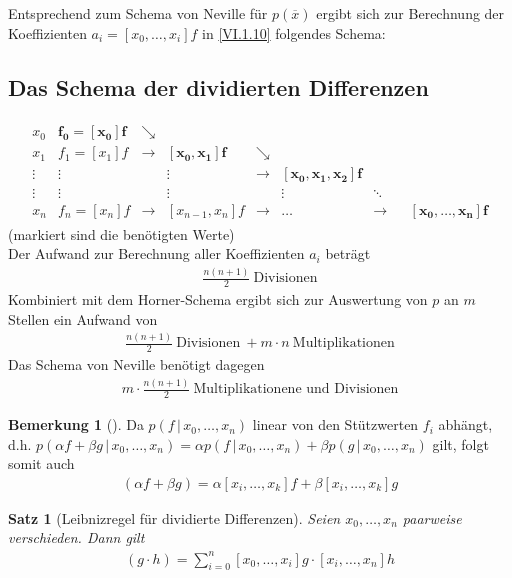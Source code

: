 \documentclass[ngerman,fontsize=11pt, paper=a4, parskip=half, titlepage=true, toc=bib]{scrbook}
\theoremstyle{definition}
\newtheorem{Bem}[Def]{Bemerkung}	%
\theoremstyle{plain}
\newtheorem{Satz}[Def]{Satz}		%
\newcommand{\subsectione}[1]{\addtocounter{Def}{1}\subsection{#1}}
\newenvironment{Satze}[1][]{ %
  \begin{Satz}[#1]  }
  { \end{Satz}
  	\addtocounter{subsection}{1}}
\newenvironment{Beme}[1][]{ %
  \begin{Bem}[#1]}
  {\end{Bem}
  	\addtocounter{subsection}{1}}
\begin{document}
Entsprechend zum Schema von Neville für $p(\overline{x})$
ergibt sich zur Berechnung der Koeffizienten $a_i=[x_0,\dots,x_i]f$
in \eqref{VI.1.10} folgendes Schema:

\subsectione{Das Schema der dividierten Differenzen}
 \begin{gather*}
   \begin{array}{ccccccccc}
          x_0 & \boldsymbol{f_0=[x_0]f} & \searrow\\
          x_1 & f_1=[x_1]f& \rightarrow &\boldsymbol{ [x_0,x_1]f}&\searrow \\
          \vdots&\vdots &&\vdots &\rightarrow & \boldsymbol{[x_0,x_1,x_2]f}\\
          \vdots&\vdots &&\vdots &&\vdots&\ddots\\
          x_n& f_n=[x_n]f &\rightarrow&[x_{n-1},x_n]f&\rightarrow &
          \dots &\rightarrow && \boldsymbol{[x_0,\dots,x_n]f}
   \end{array}
 \end{gather*}
(markiert sind die benötigten Werte)\\
Der Aufwand zur Berechnung aller Koeffizienten $a_i$ beträgt
\begin{gather*}
  \frac{n(n+1)}{2} ~\text{Divisionen}
\end{gather*}
Kombiniert mit dem Horner-Schema ergibt sich
zur Auswertung von $p$ an $m$ Stellen ein Aufwand von
\begin{gather*}
  \frac{n(n+1)}{2} ~\text{Divisionen}
  ~+m\cdot n   ~\text{Multiplikationen}
\end{gather*}
Das Schema von Neville benötigt dagegen
\begin{gather*}
  m\cdot\frac{n(n+1)}{2} ~\text{Multiplikationene und Divisionen}
\end{gather*}

\begin{Beme}
  Da $p(f\,|\, x_0,\dots, x_n)$ linear von den Stützwerten $f_i$
  abhängt,
  d.h. $p(\alpha f+\beta g\,|\, x_0,\dots, x_n)= 
  \alpha p(f\,|\, x_0,\dots, x_n)+\beta p(g\,|\, x_0,\dots, x_n)$
  gilt, folgt somit auch
  \begin{gather*}
    [x_i,\dots, x_k](\alpha f+\beta g)
    =  \alpha [x_i,\dots, x_k]f+\beta [x_i,\dots, x_k]g 
  \end{gather*}
\end{Beme}


\begin{Satze}[Leibnizregel für dividierte Differenzen]\label{6.1.10}
  Seien $x_0,\dots, x_n$ paarweise verschieden. Dann gilt
  \begin{gather}
    [x_0,\dots, x_n] (g\cdot h) = \sum_{i=0}^{n}[x_0,\dots,x_i]g\cdot [x_i,\dots,x_n]h
    \label{VI.1.14}
  \end{gather}
\end{Satze}
\end{document}
